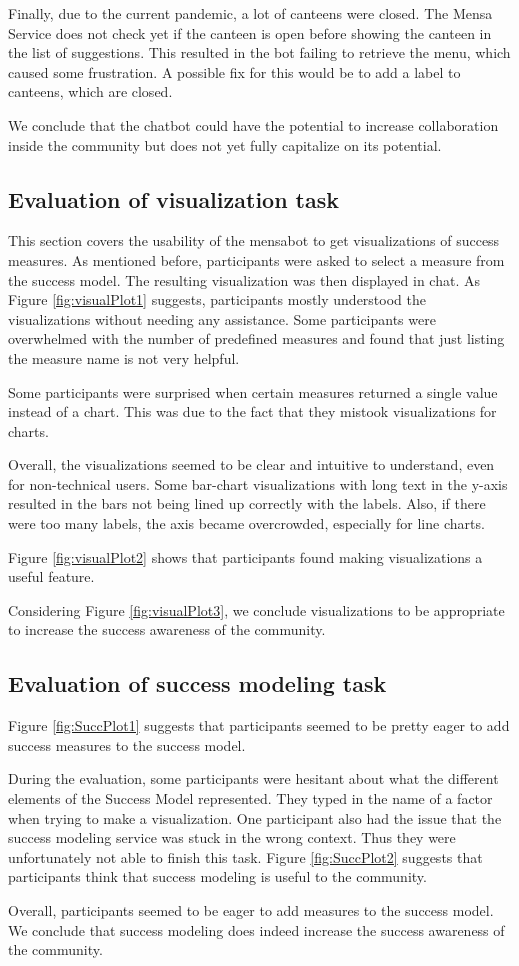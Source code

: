 Finally, due to the current pandemic, a lot of canteens were closed. The Mensa Service does not check yet if the canteen is open before showing the canteen in the list of suggestions. This resulted in the bot failing to retrieve the menu, which caused some frustration. A possible fix for this would be to add a label to canteens, which are closed.


We conclude that the chatbot could have the potential to increase collaboration inside the community but does not yet fully capitalize on its potential. 

\subsection{Evaluation of visualization task}

This section covers the usability of the mensabot to get visualizations of success measures. As mentioned before, participants were asked to select a measure from the success model. The resulting visualization was then displayed in chat. As Figure \ref{fig:visualPlot1} suggests, participants mostly understood the visualizations without needing any assistance. Some participants were overwhelmed with the number of predefined measures and found that just listing the measure name is not very helpful. 

Some participants were surprised when certain measures returned a single value instead of a chart. This was due to the fact that they mistook visualizations for charts. 

Overall, the visualizations seemed to be clear and intuitive to understand, even for non-technical users. Some bar-chart visualizations with long text in the y-axis resulted in the bars not being lined up correctly with the labels. Also, if there were too many labels, the axis became overcrowded, especially for line charts.

Figure \ref{fig:visualPlot2} shows that participants found making visualizations a useful feature. 

Considering Figure \ref{fig:visualPlot3}, we conclude visualizations to be appropriate to increase the success awareness of the community.

\subsection{Evaluation of success modeling task}
Figure \ref{fig:SuccPlot1} suggests that participants seemed to be pretty eager to add success measures to the success model.

During the evaluation, some participants were hesitant about what the different elements of the Success Model represented. They typed in the name of a factor when trying to make a visualization.
One participant also had the issue that the success modeling service was stuck in the wrong context. Thus they were unfortunately not able to finish this task.
Figure \ref{fig:SuccPlot2} suggests that participants think that success modeling is useful to the community.

Overall, participants seemed to be eager to add measures to the success model.
We conclude that success modeling does indeed increase the success awareness of the community. 

